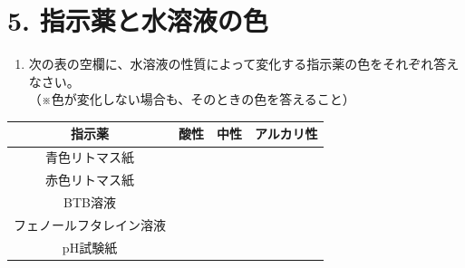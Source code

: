 \section*{5. 指示薬と水溶液の色}
\begin{enumerate}
    \item 次の表の空欄に、水溶液の性質によって変化する指示薬の色をそれぞれ答えなさい。\\
    （※色が変化しない場合も、そのときの色を答えること）
\end{enumerate}
\begin{center}
\renewcommand{\arraystretch}{1.8}
\begin{tabular}{|c|c|c|c|}
\hline
指示薬 & 酸性 & 中性 & アルカリ性 \\ \hline
青色リトマス紙 & \hspace{3cm} &  \hspace{3cm}  &  \hspace{3cm}  \\ \hline
赤色リトマス紙 &  \hspace{3cm}  &  \hspace{3cm}  &  \hspace{3cm}  \\ \hline
BTB溶液 &  \hspace{3cm} &  \hspace{3cm}  & \hspace{3cm} \\ \hline
フェノールフタレイン溶液 &  \hspace{3cm}  &  \hspace{3cm} &  \hspace{3cm}  \\ \hline
pH試験紙 &  \hspace{3cm}  &  \hspace{3cm}  & \hspace{3cm}  \\ \hline
\end{tabular}
\end{center}
